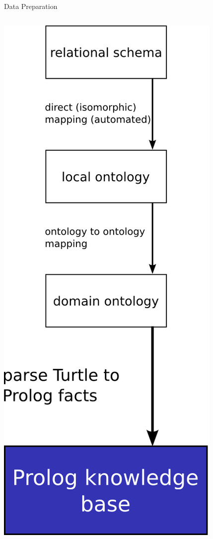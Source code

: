 \message{ !name(presentation.tex)}\documentclass{beamer}
\begin{document}
\begin{frame}{Data Preparation}
\begin{columns}
\begin{column}{.3\textwidth}
\includegraphics[width=\textwidth,height=.88\textheight,keepaspectratio]{prologkb}

\end{column}
\end{columns}
\end{frame}
\end{document}
